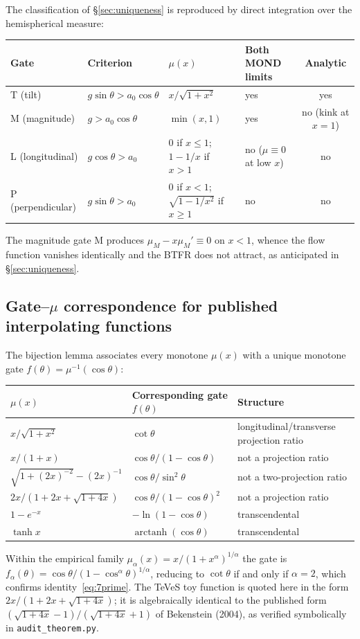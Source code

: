 \documentclass[11pt]{article}
\theoremstyle{plain}
\begin{document}
The classification of \S\ref{sec:uniqueness} is reproduced by direct
integration over the hemispherical measure:
\begin{center}
\small
\setlength{\tabcolsep}{4pt}
\begin{tabular}{llllc}
\toprule
Gate & Criterion & $\mu(x)$ & Both MOND limits & Analytic \\
\midrule
T (tilt)         & $g\sin\theta > a_0\cos\theta$ & $x/\sqrt{1+x^{2}}$
                 & yes & yes \\
M (magnitude)    & $g > a_0\cos\theta$ & $\min(x,1)$
                 & yes & no (kink at $x=1$) \\
L (longitudinal) & $g\cos\theta > a_0$
                 & $0$ if $x\le1$; $1-1/x$ if $x>1$
                 & no ($\mu\equiv0$ at low $x$) & no \\
P (perpendicular)& $g\sin\theta > a_0$
                 & $0$ if $x<1$; $\sqrt{1-1/x^{2}}$ if $x\ge1$
                 & no & no \\
\bottomrule
\end{tabular}
\end{center}
The magnitude gate M produces $\mu_{M}-x\mu_{M}'\equiv0$ on $x<1$, whence the
flow function vanishes identically and the BTFR does not attract, as
anticipated in \S\ref{sec:uniqueness}.

\subsection{Gate--$\mu$ correspondence for published interpolating functions}

The bijection lemma associates every monotone $\mu(x)$ with a unique monotone
gate $f(\theta)=\mu^{-1}(\cos\theta)$:
\begin{center}
\begin{tabular}{lll}
\toprule
$\mu(x)$ & Corresponding gate $f(\theta)$ & Structure \\
\midrule
$x/\sqrt{1+x^{2}}$ & $\cot\theta$
   & longitudinal/transverse projection ratio \\
$x/(1+x)$ & $\cos\theta/(1-\cos\theta)$ & not a projection ratio \\
$\sqrt{1+(2x)^{-2}}-(2x)^{-1}$ & $\cos\theta/\sin^{2}\!\theta$
   & not a two-projection ratio \\
$2x/(1+2x+\sqrt{1+4x})$ & $\cos\theta/(1-\cos\theta)^{2}$
   & not a projection ratio \\
$1-e^{-x}$ & $-\ln(1-\cos\theta)$ & transcendental \\
$\tanh x$ & $\operatorname{arctanh}(\cos\theta)$ & transcendental \\
\bottomrule
\end{tabular}
\end{center}
Within the empirical family $\mu_{\alpha}(x)=x/(1+x^{\alpha})^{1/\alpha}$ the
gate is $f_{\alpha}(\theta)=\cos\theta/(1-\cos^{\alpha}\theta)^{1/\alpha}$,
reducing to $\cot\theta$ if and only if $\alpha=2$, which confirms
identity~\eqref{eq:7prime}. The TeVeS toy function is quoted here in the form
$2x/(1+2x+\sqrt{1+4x})$; it is algebraically identical to the published form
$(\sqrt{1+4x}-1)/(\sqrt{1+4x}+1)$ of Bekenstein (2004), as verified
symbolically in \verb|audit_theorem.py|.
\end{document}
